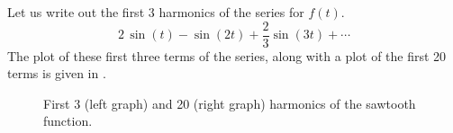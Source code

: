 \documentclass[12pt]{book}
\begin{document}
\begin{example}
Let us write out the first 3 harmonics of the series for $f(t)$.
\begin{equation*}
2 \, \sin (t)
- \sin (2t)
+\frac{2}{3} \sin (3t)
+ \cdots
\end{equation*}
The plot of these first three terms of the series, along with a plot
of the first 20 terms is given in
.

\begin{figure}[h!t]
\capstart
\begin{center}
\qquad
{}
\caption{First 3 (left graph) and 20 (right graph) harmonics of the sawtooth
function.\label{ts:sawtoothfsfig}}
\end{center}
\end{figure}
\end{example}
\end{document}
